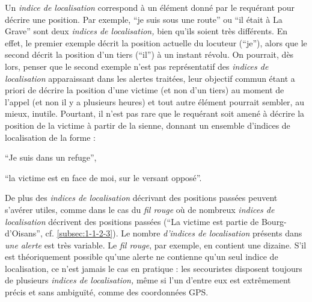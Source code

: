 Un \emph{indice de localisation} correspond à un élément donné par le
requérant pour décrire une position. Par exemple, \enquote{je suis
  sous une route} ou \enquote{il était à La Grave} sont deux
\emph{indices de localisation,} bien qu'ils soient très différents. En
effet, le premier exemple décrit la position actuelle du locuteur
(\enquote{je}), alors que le second décrit la position d'un tiers
(\enquote{il}) à un instant révolu. On pourrait, dès lors, penser que
le second exemple n'est pas représentatif des \emph{indices de
  localisation} apparaissant dans les alertes traitées, leur objectif
commun étant a priori de décrire la position d'une victime (et non
d'un tiers) au moment de l'appel (et non il y a plusieurs heures) et
tout autre élément pourrait sembler, au mieux, inutile. Pourtant, il
n'est pas rare que le requérant soit amené à décrire la position de la
victime à partir de la sienne, donnant un ensemble d'indices de
localisation de la forme :
%
\begin{enumerate*}[label=(\alph*)]
\item \enquote{Je suis dans un refuge},
\item \enquote{la victime est en face de moi, sur le versant opposé}.
\end{enumerate*}
% 
De plus des \emph{indices de localisation} décrivant des positions
passées peuvent s'avérer utiles, comme dans le cas du \emph{fil rouge}
où de nombreux \emph{indices de localisation} décrivent des positions
passées (\eg \enquote{La victime est partie de Bourg-d'Oisans},
cf. \ref{subsec:1-1-2-3}). Le nombre \emph{d'indices de localisation}
présents dans \emph{une alerte} est très variable. Le \emph{fil
  rouge}, par exemple, en contient une dizaine. S'il est théoriquement
possible qu'une alerte ne contienne qu'un seul indice de localisation,
ce n'est jamais le cas en pratique : les secouristes disposent
toujours de plusieurs \emph{indices de localisation,} même si l'un
d'entre eux est extrêmement précis et sans ambiguïté, comme des
coordonnées GPS.


